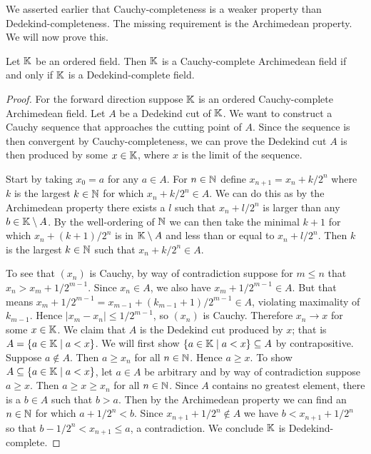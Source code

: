 \documentclass[../main.tex]{subfiles}
\begin{document}
We asserted earlier that Cauchy-completeness is a weaker property than Dedekind-completeness. The missing requirement is the Archimedean property. We will now prove this.
\begin{theorem}\label{thm:the_real_numbers:equivalence_cauchy_dedekind_completeness}
    Let $\mathbb{K}$ be an ordered field. Then $\mathbb{K}$ is a Cauchy-complete Archi\-medean field if and only if $\mathbb{K}$ is a Dedekind-complete field.
\end{theorem}
\begin{proof}
    For the forward direction suppose $\mathbb{K}$ is an ordered Cauchy-complete Archimedean field. Let $A$ be a Dedekind cut of $\mathbb{K}$. We want to construct a Cauchy sequence that approaches the cutting point of $A$. Since the sequence is then convergent by Cauchy-completeness, we can prove the Dedekind cut $A$ is then produced by some $x\in\mathbb{K}$, where $x$ is the limit of the sequence.

    Start by taking $x_0=a$ for any $a\in A$. For $n\in\mathbb{N}$ define $x_{n+1}=x_n+k/2^n$ where $k$ is the largest $k\in\mathbb{N}$ for which $x_n+k/2^n\in A$. We can do this as by the Archimedean property there exists a $l$ such that $x_n+l/2^n$ is larger than any $b\in\mathbb{K}\setminus A$. By the well-ordering of $\mathbb{N}$ we can then take the minimal $k+1$ for which $x_n+(k+1)/2^n$ is in $\mathbb{K}\setminus A$ and less than or equal to $x_n+l/2^n$. Then $k$ is the largest $k\in\mathbb{N}$ such that $x_n+k/2^n\in A$.

    To see that $(x_n)$ is Cauchy, by way of contradiction suppose for $m\leq n$ that $x_n>x_m+1/2^{m-1}$. Since $x_n\in A$, we also have $x_m+1/2^{m-1}\in A$. But that means $x_m+1/2^{m-1}=x_{m-1}+(k_{m-1}+1)/2^{m-1}\in A$, violating maximality of $k_{m-1}$. Hence $\vert x_m-x_n\vert\leq1/2^{m-1}$, so $(x_n)$ is Cauchy. Therefore $x_n\to x$ for some $x\in\mathbb{K}$. We claim that $A$ is the Dedekind cut produced by $x$; that is $A=\{a\in\mathbb{K}\mid a<x\}$. We will first show $\{a\in\mathbb{K}\mid a<x\}\subseteq A$ by contrapositive. Suppose $a\notin A$. Then $a\geq x_n$ for all $n\in\mathbb{N}$. Hence $a\geq x$. To show $A\subseteq\{a\in\mathbb{K}\mid a<x\}$, let $a\in A$ be arbitrary and by way of contradiction suppose $a\geq x$. Then $a\geq x\geq x_n$ for all $n\in\mathbb{N}$. Since $A$ contains no greatest element, there is a $b\in A$ such that $b>a$. Then by the Archimedean property we can find an $n\in\mathbb{N}$ for which $a+1/2^n<b$. Since $x_{n+1}+1/2^n\notin A$ we have $b<x_{n+1}+1/2^n$ so that $b-1/2^n<x_{n+1}\leq a$, a contradiction. We conclude $\mathbb{K}$ is Dedekind-complete.


\end{proof}
\end{document}
